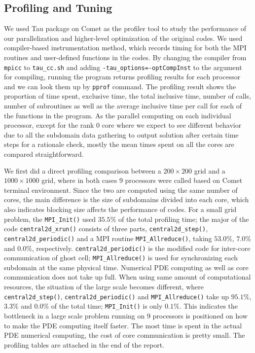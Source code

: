 \documentclass{article}
\begin{document}
\subsection{Profiling and Tuning}

We used Tau package on Comet as the profiler tool to study the performance of our parallelization and higher-level optimization of the original codes. We used compiler-based instrumentation method, which records timing for both the MPI routines and user-defined functions in the codes. By changing the compiler from \texttt{mpicc} to \texttt{tau\_cc.sh} and adding \texttt{-tau\_options=-optCompInst} to the argument for compiling, running the program returns profiling results for each processor and we can look them up by \texttt{pprof} command. The profiling result shows the proportion of time spent, exclusive time, the total inclusive time, number of calls, number of subroutines as well as the average inclusive time per call for each of the functions in the program. As the parallel computing on each individual processor, except for the rank $0$ core where we expect to see different behavior due to all the subdomain data gathering to output solution after certain time steps for a rationale check, mostly the mean times spent on all the cores are compared straightforward. 

We first did a direct profiling comparison between a $200\times200$ grid and a $1000\times1000$ grid, where in both cases 9 processors were called based on Comet terminal environment. Since the two are computed using the same number of cores, the main difference is the size of subdomains divided into each core, which also indicates blocking size affects the performance of codes. For a small grid problem, the \texttt{MPI\_Init()} used $35.5\%$ of the total profiling time; the major of the code \texttt{central2d\_xrun()} consists of three parts, \texttt{central2d\_step()}, \texttt{central2d\_periodic()} and a MPI routine \texttt{MPI\_Allreduce()}, taking $53.0\%$, $7.0\%$ and $0.0\%$, respectively. \texttt{central2d\_periodic()} is the modified code for inter-core communication of ghost cell; \texttt{MPI\_Allreduce()} is used for synchronizing each subdomain at the same physical time. Numerical PDE computing as well as core communication does not take up full.  When using same amount of computational resources, the situation of the large scale becomes different, where  \texttt{central2d\_step()}, \texttt{central2d\_periodic()} and  \texttt{MPI\_Allreduce()} take up $95.1\%$, $3.3\%$ and $0.0\%$ of the total time; \texttt{MPI\_Init()}  is only $0.1\%$. This indicates the bottleneck in a large scale problem running on 9 processors is positioned on how to make the PDE computing itself faster. The most time is spent in the actual PDE numerical computing, the cost of core communication is pretty small. The profiling tables are attached in the end of the report.
\end{document}
